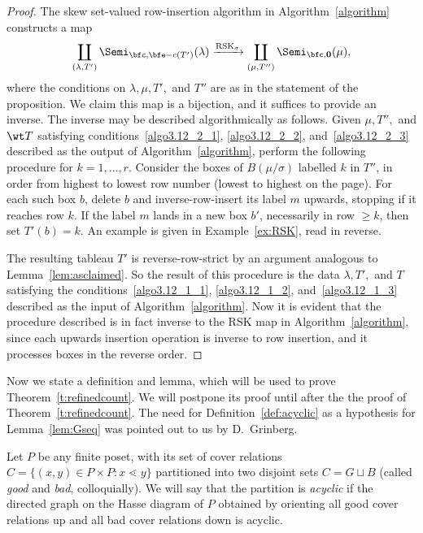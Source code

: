 \begin{proof}
 The skew set-valued row-insertion algorithm in Algorithm~\ref{algorithm} constructs a map
\begin{equation}\label{eq:ssmap}
\coprod_{(\lambda, T')} \Semi_{\bfc, \bfe-c(T')}(\lambda) \xrightarrow{\text{RSK}_\sigma}\coprod_{(\mu,T'')} \Semi_{\bfc, \mathbf{0}}(\mu),
\end{equation}
where the conditions on $\lambda,\mu,T',$ and $T''$ are as in the statement of the proposition. We claim this map is a bijection, and it suffices to provide an inverse. The inverse may be described algorithmically as follows. Given $\mu, T'',$ and $\wt T$ satisfying conditions~\eqref{algo3.12_2_1}, \eqref{algo3.12_2_2}, and~\eqref{algo3.12_2_3} described as the output of Algorithm~\ref{algorithm}, perform the following procedure for $k=1,\ldots, r$. Consider the boxes of $B(\mu/\sigma)$ labelled $k$ in $T''$, in order from highest to lowest row number (\ie lowest to highest on the page). For each such box $b$, delete $b$ and inverse-row-insert its label $m$ upwards, stopping if it reaches row $k$. If the label $m$ lands in a new box $b'$, necessarily in row $\ge k$, then set $T'(b) = k$. An example is given in Example~\ref{ex:RSK}, read in reverse.

The resulting tableau $T'$ is reverse-row-strict by an argument analogous to Lemma~\ref{lem:asclaimed}. So the result of this procedure is the data $\lambda,T',$ and $T$ satisfying the conditions~\eqref{algo3.12_1_1}, \eqref{algo3.12_1_2}, and~\eqref{algo3.12_1_3} described as the input of Algorithm~\ref{algorithm}. 
Now it is evident that the procedure described is in fact inverse to the RSK map in Algorithm~\ref{algorithm}, since each upwards insertion operation is inverse to row insertion, and it processes boxes in the reverse order.
\end{proof}

Now we state a definition and lemma, which will be used to prove Theorem~\ref{t:refinedcount}. We will postpone its proof until after the the proof of Theorem~\ref{t:refinedcount}. The need for Definition~\ref{def:acyclic} as a hypothesis for Lemma~\ref{lem:Gseq} was pointed out to us by D.~Grinberg.

\begin{defi}\label{def:acyclic}
Let $P$ be any finite poset, with its set of cover relations $C = \{(x,y)\in P\times P: x\lessdot y\}$ partitioned into two disjoint sets $C=G\sqcup B$ (called \emph{good} and \emph{bad}, colloquially). We will say that the partition is \emph{acyclic} if the directed graph on the Hasse diagram of $P$ obtained by orienting all good cover relations up and all bad cover relations down is acyclic.
\end{defi}

